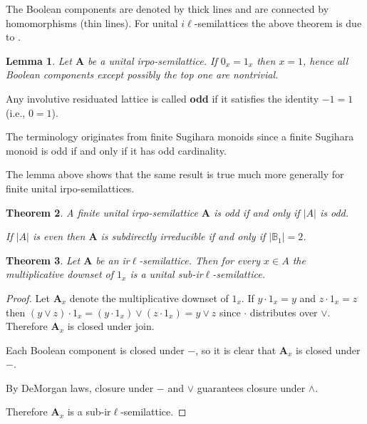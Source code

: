 \documentclass[12pt]{amsart}
\newtheorem{theorem}{Theorem}%
\newtheorem{lemma}[theorem]{Lemma}
\newcommand{\m}{\mathbf} %
\begin{document}
	The Boolean components are denoted by thick lines and are connected by homomorphisms (thin lines). For unital $i\ell$-semilattices the above theorem is due to 
	\cite{JTV2020}.%

\begin{lemma}
Let $\m A$ be a unital irpo-semilattice. If $0_x=1_x$ then $x=1$, hence all Boolean components except possibly the top one are nontrivial.
\end{lemma}

Any involutive residuated lattice is called \textbf{odd} if it satisfies the identity $-1 = 1$ (i.e., $0=1$).

The terminology originates from finite Sugihara monoids since a finite Sugihara monoid is odd if and only if it has odd cardinality.

The lemma above shows that the same result is true much more generally for finite unital irpo-semilattices.

\begin{theorem}
A finite unital irpo-semilattice $\m A$ is odd if and only if $|A|$ is odd.

If $|A|$ is even then $\m A$ is subdirectly irreducible if and only if $|\mathbb B_1|=2$.
\end{theorem}

\begin{theorem} 
	Let $\mathbf{A}$ be an ir$\ell$-semilattice. Then for every $x \in A$ the multiplicative downset of $1_x$ is a unital sub-ir$\ell$-semilattice.
\end{theorem}
\begin{proof}
		Let $\mathbf A_x$ denote the multiplicative downset of $1_x$. If $y\cdot 1_x=y$ and $z\cdot 1_x=z$ then $(y\vee z) \cdot 1_x = (y\cdot 1_x) \vee (z \cdot 1_x) = y \vee z$ since $\cdot$ distributes over $\vee$. Therefore $\mathbf A_x$ is closed under join.
		
		Each Boolean component is closed under $-$, so it is clear that $\mathbf A_x$ is closed under $-$.
		
		By DeMorgan laws, closure under $-$ and $\vee$ guarantees closure under $\wedge$.
		
	Therefore $\mathbf A_x$ is a sub-ir$\ell$-semilattice.
\end{proof}
\end{document}
